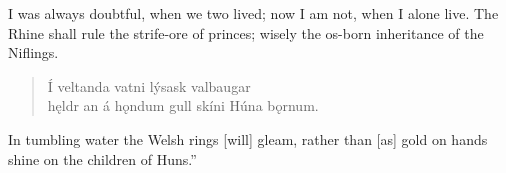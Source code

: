 \bvb I was always doubtful, when we two lived; now I am not, when I alone live. The Rhine shall rule the strife-ore of princes; wisely the os-born inheritance of the Niflings.

\begin{verse}
\bva Í veltanda vatni \hld lýsask valbaugar \\%
hęldr an á hǫndum gull \hld skíni Húna bǫrnum.\\%
\end{verse}

\bvb In tumbling water the Welsh rings [will] gleam, rather than [as] gold on hands shine on the children of Huns.”
